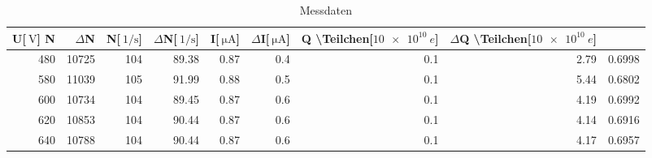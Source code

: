 
\begin{table}[!h]
\begin{center}
\begin{tabular}{|r|r|r|r|r|r|r|r|r|}
\hline
U[$\SI{}{\volt}$] N & $\Delta$N & N[$\SI{}{1\per\second}$] & $\Delta$N[$\SI{}{1\per\second}$] & I[$\SI{}{\micro\ampere}$] & $\Delta$I[$\SI{}{\micro\ampere}$] & Q \backslash Teilchen[$\SI{10 e10}{e}$] & $\Delta$Q \backslash Teilchen[$\SI{10 e10}{e}$] \\
\hline
\hline
480	 &   10725 & 104 & 89.38  & 0.87 &	0.4	& 0.1 & 2.79 & 0.6998\\
580	 &   11039 & 105 & 91.99  & 0.88 &	0.5	& 0.1 & 5.44 & 0.6802\\
600	 &   10734 & 104 & 89.45  & 0.87 &	0.6	& 0.1 & 4.19 & 0.6992\\
620	 &   10853 & 104 & 90.44	& 0.87 &	0.6	& 0.1 & 4.14 & 0.6916\\
640	 &   10788 & 104 & 90.44	& 0.87 &	0.6	& 0.1 & 4.17 & 0.6957\\
\hline
\end{tabular}
\caption[Aufgabe e]{Messdaten}
\label{tabellee}
\end{center}
\end{table}